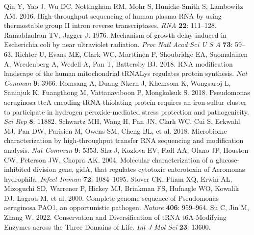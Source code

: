 \documentclass[times, twoside]{zHenriquesLab-StyleBioRxiv}
\begin{document}
\newline
\newline
Qin Y, Yao J, Wu DC, Nottingham RM, Mohr S, Hunicke-Smith S, Lambowitz AM. 2016. High-throughput sequencing of human plasma RNA by using thermostable group II intron reverse transcriptases. \textit{RNA} \textbf{22}: 111–128. 
\newline
\newline
Ramabhadran TV, Jagger J. 1976. Mechanism of growth delay induced in Escherichia coli by near ultraviolet radiation. \textit{Proc Natl Acad Sci U S A} \textbf{73}: 59–63. 
\newline
\newline
Richter U, Evans ME, Clark WC, Marttinen P, Shoubridge EA, Suomalainen A, Wredenberg A, Wedell A, Pan T, Battersby BJ. 2018. RNA modification landscape of the human mitochondrial tRNALys regulates protein synthesis. \textit{Nat Commun} \textbf{9}: 3966. 
\newline
\newline
Romsang A, Duang-Nkern J, Khemsom K, Wongsaroj L, Saninjuk K, Fuangthong M, Vattanaviboon P, Mongkolsuk S. 2018. Pseudomonas aeruginosa ttcA encoding tRNA-thiolating protein requires an iron-sulfur cluster to participate in hydrogen peroxide-mediated stress protection and pathogenicity. \textit{Sci Rep} \textbf{8}: 11882. 
\newline
\newline
Schwartz MH, Wang H, Pan JN, Clark WC, Cui S, Eckwahl MJ, Pan DW, Parisien M, Owens SM, Cheng BL, et al. 2018. Microbiome characterization by high-throughput transfer RNA sequencing and modification analysis. \textit{Nat Commun} \textbf{9}: 5353. 
\newline
\newline
Sha J, Kozlova EV, Fadl AA, Olano JP, Houston CW, Peterson JW, Chopra AK. 2004. Molecular characterization of a glucose-inhibited division gene, gidA, that regulates cytotoxic enterotoxin of Aeromonas hydrophila. \textit{Infect Immun} \textbf{72}: 1084–1095. 
\newline
\newline
Stover CK, Pham XQ, Erwin AL, Mizoguchi SD, Warrener P, Hickey MJ, Brinkman FS, Hufnagle WO, Kowalik DJ, Lagrou M, et al. 2000. Complete genome sequence of Pseudomonas aeruginosa PAO1, an opportunistic pathogen. \textit{Nature} \textbf{406}: 959–964. 
\newline
\newline
Su C, Jin M, Zhang W. 2022. Conservation and Diversification of tRNA t6A-Modifying Enzymes across the Three Domains of Life. \textit{Int J Mol Sci} \textbf{23}: 13600. 
\end{document}
